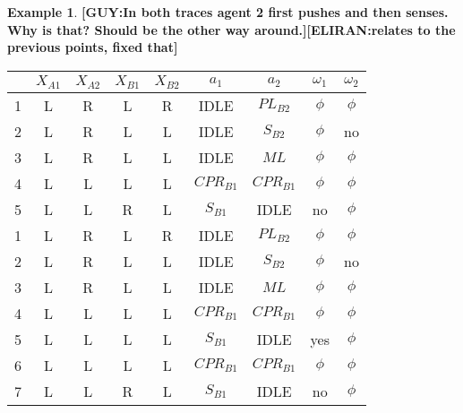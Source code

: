 \documentclass[letterpaper]{article} %
\theoremstyle{definition}
\newtheorem{example}{Example}
\newcommand{\eliran}[1]{\textbf{[\color{red}ELIRAN:#1]}}
\newcommand{\guy}[1]{\textbf{[\color{orange}GUY:#1]}}
\begin{document}
\begin{example}
\guy{In both traces agent 2 first pushes and then senses. Why is that? Should be the other way around.}\eliran{relates to the previous points, fixed that}
\begin{table}[ht]
    \centering
    \scriptsize
    \begin{tabular}{|c||c|c|c|c||c|c||c|c|}
    \hline
     &$X_{A1}$&$X_{A2}$&$X_{B1}$&$X_{B2}$&$a_1$&$a_2$&$\omega_1$&$\omega_2$\\ \hline
    1 &L&R&L&R&IDLE&$PL_{B2}$&$\phi$& $\phi$\\
    2 &L&R&L&L&IDLE&$S_{B2}$&$\phi$& no\\
    3 &L&R&L&L&IDLE&$ML$&$\phi$&$\phi$\\
    4 &L&L&L&L&$CPR_{B1}$&$CPR_{B1}$&$\phi$&$\phi$\\
    5   &L&L&R&L&$S_{B1}$& IDLE&no&$\phi$\\ \hline
    \hline\hline
    1 &L&R&L&R&IDLE&$PL_{B2}$&$\phi$& $\phi$\\
    2 &L&R&L&L&IDLE&$S_{B2}$&$\phi$& no\\
    3 &L&R&L&L&IDLE&$ML$&$\phi$&$\phi$\\
    4 &L&L&L&L&$CPR_{B1}$&$CPR_{B1}$&$\phi$&$\phi$\\
    5 &L&L&L&L&$S_{B1}$& IDLE&yes&$\phi$\\
    6 &L&L&L&L&$CPR_{B1}$&$CPR_{B1}$&$\phi$&$\phi$\\
    7 &L&L&R&L&$S_{B1}$& IDLE&no&$\phi$\\ \hline

\end{tabular}
\end{table}
\end{example}
\end{document}
